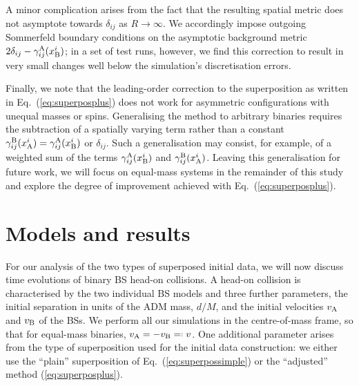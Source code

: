 \documentclass[]{iopart}
\newcommand*{\invdefeq}{=\mathrel{\vcenter{\baselineskip0.5ex \lineskiplimit0pt
                     \hbox{\scriptsize.}\hbox{\scriptsize.}}}%
                     }
\begin{document}
A minor complication arises from the fact that the resulting spatial
metric does not asymptote towards $\delta_{ij}$ as $R\rightarrow
\infty$. We accordingly impose outgoing Sommerfeld boundary conditions
on the asymptotic background metric $2\delta_{ij}-\gamma_{ij}^{\rm
A}(x^i_{\rm B})$; in a set of test runs, however, we find this
correction to result in very small changes well below the simulation's
discretisation errors.

Finally, we note that the leading-order correction to the superposition
as written in Eq.~(\ref{eq:superposplus}) does not work for asymmetric
configurations with unequal masses or spins. Generalising the method
to arbitrary binaries requires the subtraction of a spatially varying
term rather than a constant $\gamma_{ij}^{\rm B}(x^i_{\rm
A})=\gamma_{ij}^{\rm A}(x^i_{\rm B})$ or $\delta_{ij}$. Such a
generalisation may consist, for example, of a weighted sum of the
terms $\gamma_{ij}^{\rm A}(x^i_{\rm B})$ and $\gamma_{ij}^{\rm
B}(x^i_{\rm A})$. Leaving this generalisation for future work, we
will focus on equal-mass systems in the remainder of this study and
explore the degree of improvement achieved with
Eq.~(\ref{eq:superposplus}).


\section{Models and results}
\label{sec:results}
%
For our analysis of the two types of superposed initial data, we
will now discuss time evolutions of binary BS head-on collisions.
A head-on collision is characterised by the two individual BS models
and three further parameters, the initial separation in units of
the ADM mass, $d/M$, and the initial velocities $v_{\rm A}$ and
$v_{\rm B}$ of the BSs. We perform all our simulations in the
centre-of-mass frame, so that for equal-mass binaries, $v_{\rm
A}=-v_{\rm B}\invdefeq v$.  One additional parameter arises from
the type of superposition used for the initial data construction:
we either use the ``plain'' superposition of Eq.~(\ref{eq:superpossimple})
or the ``adjusted'' method (\ref{eq:superposplus}).
\end{document}
